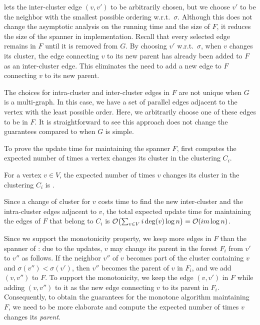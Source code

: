 \begin{remark} \label{remark:inter_cluster}
\cite{Abraham:2016aa} lets the inter-cluster edge \( (v, v') \) to be arbitrarily chosen, but we choose \( v' \) to be the neighbor with the smallest possible ordering w.r.t.\ \( \sigma \).
Although this does not change the asymptotic analysis on the running time and the size of \( F \), it reduces the size of the spanner in implementation.
Recall that every selected edge remains in \( F \) until it is removed from \( G \).
By choosing \( v' \) w.r.t.\ \( \sigma \), when \( v \) changes its cluster, the edge connecting \( v \) to its new parent has already been added to \( F \) as an inter-cluster edge.
This eliminates the need to add  a new edge to \( F \) connecting \( v \) to its new parent.
\end{remark}


\begin{remark}
The choices for intra-cluster and inter-cluster edges in \( F \) are not unique when \( G \) is a multi-graph.
In this case, we have a set of parallel edges adjacent to the vertex with the least possible order.
Here, we arbitrarily choose one of these edges to be in \( F \). 
It is straightforward to see this approach does not change the guarantees compared to when \( G \) is simple.
\end{remark}


To prove the update time for maintaining the spanner \( F \), \cite{Baswana:2012aa} first computes the expected number of times a vertex changes its cluster in the clustering \( C_i \).

\begin{lemma} \label{lem:cluster_change}
For a vertex \( v \in V \), the expected number of times \( v \) changes its cluster in the clustering \( C_i \) is .
\end{lemma}

Since a change of cluster for \( v \) costs  time to find the new inter-cluster and the intra-cluster edges adjacent to \( v \), the total expected update time for maintaining the edges of \( F \) that belong to \( C_i \) is \( \atmost{\sum _{v \in V} i \deg(v) \log n} = \atmost{i m \log n} \).

Since we support the monotonicity property, we keep more edges in \( F \) than the spanner of \cite{Baswana:2012aa}: due to the updates, \( v \) may change its parent in the forest \( F_i \) from \( v' \) to \( v'' \) as follows.
If the neighbor \( v'' \) of \( v \) becomes part of the cluster containing \( v \) and \( \sigma(v'') < \sigma(v') \), then \( v'' \) becomes the parent of \( v \) in \( F_i \), and we add \( (v, v'') \) to \( F \).
To support the monotonicity, we  keep the edge \( (v, v') \) in \( F \) while adding \( (v, v'') \) to it as the new edge connecting \( v \) to its parent in \( F_i \).
Consequently, to obtain the guarantees for the monotone algorithm maintaining \( F \), we need to be more elaborate and compute the expected number of times \( v \) changes its \textit{parent}.


